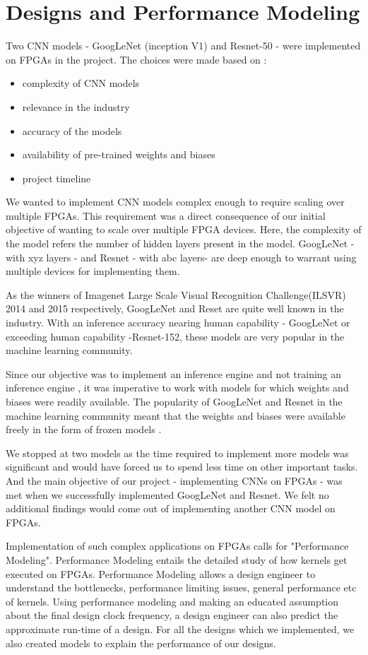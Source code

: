 \chapter{Designs and Performance Modeling}

Two CNN models - GoogLeNet (inception V1) and Resnet-50 - were implemented on FPGAs in the project. The choices were made based on :  
\begin{itemize}
  \item complexity of CNN models
  \item relevance in the industry
  \item accuracy of the models
  \item availability of pre-trained weights and biases
  \item project timeline
\end{itemize}  
We wanted to implement CNN models complex enough to require scaling over multiple FPGAs. This requirement was a direct consequence of our initial objective of wanting to scale over multiple FPGA devices. Here, the complexity of the model refers the number of hidden layers present in the model. GoogLeNet - with  xyz layers - and Resnet - with abc  layers- are deep enough to warrant using multiple devices for implementing them.

As the winners of Imagenet Large Scale Visual Recognition Challenge(ILSVR) 2014 and 2015 respectively, GoogLeNet and Reset are quite well known in the industry. With an inference accuracy nearing human capability - GoogLeNet or exceeding human capability -Resnet-152, these models are very popular in the machine learning community. 

Since our objective was to implement an inference engine and not training an inference engine , it was imperative to work with models for which weights and biases were readily available. The popularity of GoogLeNet and Resnet in the machine learning community meant that the weights and biases were available freely in the form of frozen models .

We stopped at two models as the time required to implement more models was significant and would have forced us to spend less time on other important tasks. And the main objective of our project - implementing CNNs on FPGAs - was met when we successfully implemented GoogLeNet and Resnet. We felt no additional findings would come out of implementing another CNN model on FPGAs.

Implementation of such complex applications on FPGAs calls for "Performance Modeling". Performance Modeling entails the detailed study of how kernels get executed on FPGAs. Performance Modeling allows a design engineer to understand the bottlenecks, performance limiting issues, general performance etc of kernels. Using performance modeling and making an educated assumption about the final design clock frequency, a design engineer can also predict the approximate run-time of a design.
For all the designs which we implemented, we also created models to explain the performance of our designs.    

